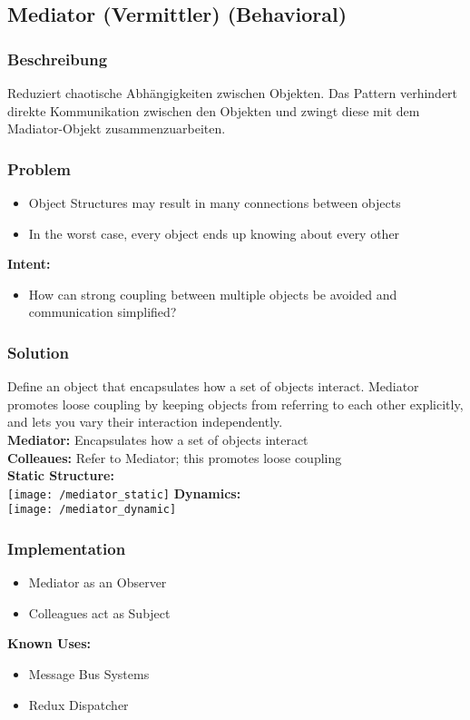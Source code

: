\subsection{Mediator (Vermittler) (Behavioral)}
\subsubsection{Beschreibung}
Reduziert chaotische Abhängigkeiten zwischen Objekten. Das Pattern verhindert direkte Kommunikation zwischen den Objekten und zwingt diese mit dem Madiator-Objekt zusammenzuarbeiten.
\subsubsection{Problem}
\begin{itemize}[topsep=0pt]
    \itemsep -0.4em
    \item Object Structures may result in many connections between objects
    \item In the worst case, every object ends up knowing about every other
\end{itemize}
\textbf{Intent:}
\begin{itemize}[topsep=0pt]
    \itemsep -0.4em
    \item How can strong coupling between multiple objects be avoided and communication simplified?
\end{itemize}
\subsubsection{Solution}
Define an object that encapsulates how a set of objects interact. Mediator promotes loose coupling by keeping objects from referring to each other explicitly, and lets you vary their interaction independently.\\ 
\textbf{Mediator:} Encapsulates how a set of objects interact\\ 
\textbf{Colleaues:} Refer to Mediator; this promotes loose coupling\\ 
\textbf{Static Structure:}\\
\texttt{[image: /mediator\_static]}
\textbf{Dynamics:}\\ 
\texttt{[image: /mediator\_dynamic]}
\subsubsection{Implementation}
\begin{itemize}[topsep=0pt]
    \itemsep -0.4em
    \item Mediator as an Observer
    \item Colleagues act as Subject
\end{itemize}
\textbf{Known Uses:}
\begin{itemize}[topsep=0pt]
    \itemsep -0.4em
    \item Message Bus Systems
    \item Redux Dispatcher
\end{itemize}
